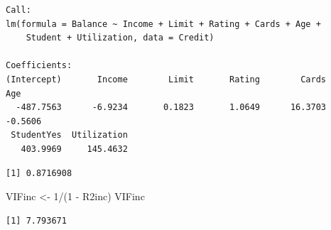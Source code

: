 \documentclass[
]{article}
\newenvironment{Shaded}{\begin{snugshade}}{\end{snugshade}}
\newcommand{\AttributeTok}[1]{\textcolor[rgb]{0.77,0.63,0.00}{#1}}
\newcommand{\DecValTok}[1]{\textcolor[rgb]{0.00,0.00,0.81}{#1}}
\newcommand{\FunctionTok}[1]{\textcolor[rgb]{0.00,0.00,0.00}{#1}}
\newcommand{\NormalTok}[1]{#1}
\newcommand{\OtherTok}[1]{\textcolor[rgb]{0.56,0.35,0.01}{#1}}
\newcommand{\SpecialCharTok}[1]{\textcolor[rgb]{0.00,0.00,0.00}{#1}}
\begin{document}
\begin{verbatim}
Call:
lm(formula = Balance ~ Income + Limit + Rating + Cards + Age + 
    Student + Utilization, data = Credit)

Coefficients:
(Intercept)       Income        Limit       Rating        Cards          Age  
  -487.7563      -6.9234       0.1823       1.0649      16.3703      -0.5606  
 StudentYes  Utilization  
   403.9969     145.4632  
\end{verbatim}

\begin{Shaded}
\end{Shaded}

\begin{verbatim}
[1] 0.8716908
\end{verbatim}

\begin{Shaded}
\begin{Highlighting}[]
\NormalTok{VIFinc }\OtherTok{\textless{}{-}} \DecValTok{1}\SpecialCharTok{/}\NormalTok{(}\DecValTok{1} \SpecialCharTok{{-}}\NormalTok{ R2inc)}
\NormalTok{VIFinc}
\end{Highlighting}
\end{Shaded}

\begin{verbatim}
[1] 7.793671
\end{verbatim}

\begin{Shaded}
\end{Shaded}
\end{document}

